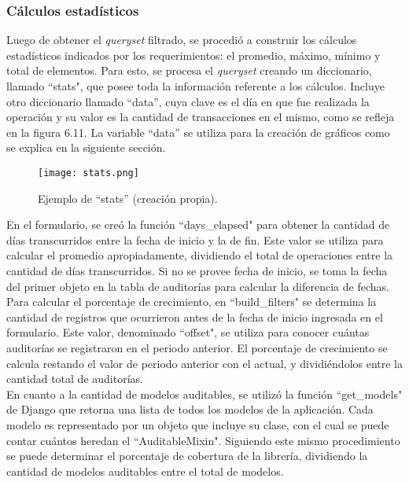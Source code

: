 \subsubsection{Cálculos estadísticos}

Luego de obtener el \textit{queryset} filtrado, se procedió a construir los cálculos estadísticos indicados por los requerimientos: el promedio, máximo, mínimo y total de elementos. Para esto, se procesa el \textit{queryset} creando un diccionario, llamado “stats",  que posee toda la información referente a los cálculos. Incluye otro diccionario llamado “data”, cuya clave es el día en que fue realizada la operación y su valor es la cantidad de transacciones en el mismo, como se refleja en la figura 6.11. La variable “data” se utiliza para la creación de gráficos como se explica en la siguiente sección.\\

\begin{figure}[h]
\centering
\texttt{[image: stats.png]}
\caption{Ejemplo de “stats” (creación propia).}
\label{fig:figura6.11}
\end{figure}

En el formulario, se creó la función “days\_elapsed" para obtener la cantidad de días transcurridos entre la fecha de inicio y la de fin. Este valor se utiliza para calcular el promedio apropiadamente, dividiendo el total de operaciones entre la cantidad de días transcurridos. Si no se provee fecha de inicio, se toma la fecha del primer objeto en la tabla de auditorías para calcular la diferencia de fechas.\\

Para calcular el porcentaje de crecimiento, en “build\_filters" se determina la cantidad de registros que ocurrieron antes de la fecha de inicio ingresada en el formulario. Este valor, denominado “offset", se utiliza para conocer cuántas auditorías se registraron en el periodo anterior. El porcentaje de crecimiento se calcula restando el valor de periodo anterior con el actual, y dividiéndolos entre la cantidad total de auditorías.\\

En cuanto a la cantidad de modelos auditables, se utilizó la función “get\_models" de Django que retorna una lista de todos los modelos de la aplicación. Cada modelo es representado por un objeto que incluye su clase, con el cual se puede contar cuántos heredan el “AuditableMixin". Siguiendo este mismo procedimiento se puede determinar el porcentaje de cobertura de la librería, dividiendo la cantidad de modelos auditables entre el total de modelos.\\

